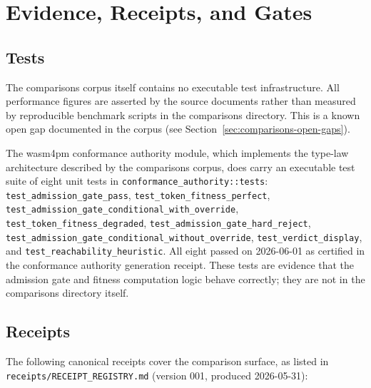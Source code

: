 
\section{Evidence, Receipts, and Gates}
\label{sec:comparisons-evidence}

\subsection{Tests}
\label{sec:comparisons-evidence-tests}

The comparisons corpus itself contains no executable test infrastructure. All
performance figures are asserted by the source documents rather than measured
by reproducible benchmark scripts in the comparisons directory. This is a known
open gap documented in the corpus (see Section~\ref{sec:comparisons-open-gaps}).

The wasm4pm conformance authority module, which implements the type-law
architecture described by the comparisons corpus, does carry an executable
test suite of eight unit tests in \texttt{conformance\_authority::tests}:
\texttt{test\_admission\_gate\_pass}, \texttt{test\_token\_fitness\_perfect},
\texttt{test\_admission\_gate\_conditional\_with\_override},
\texttt{test\_token\_fitness\_degraded}, \texttt{test\_admission\_gate\_hard\_reject},
\texttt{test\_admission\_gate\_conditional\_without\_override},
\texttt{test\_verdict\_display}, and \texttt{test\_reachability\_heuristic}. All
eight passed on 2026-06-01 as certified in the conformance authority generation
receipt. These tests are evidence that the admission gate and fitness computation
logic behave correctly; they are not in the comparisons directory itself.

\subsection{Receipts}
\label{sec:comparisons-evidence-receipts}

The following canonical receipts cover the comparison surface, as listed in
\texttt{receipts/RECEIPT\_REGISTRY.md} (version 001, produced 2026-05-31):

